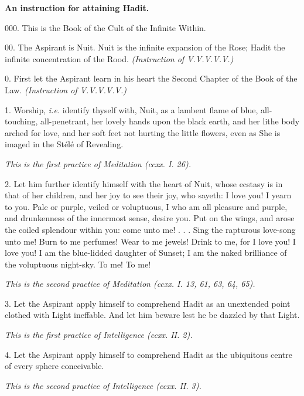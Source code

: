 

\textbf{An instruction for attaining Hadit.}

000. This is the Book of the Cult of the Infinite Within.

00. The Aspirant is Nuit. Nuit is the infinite expansion of the Rose; Hadit the infinite concentration of the Rood. \textit{(Instruction of V.V.V.V.V.)}

0. First let the Aspirant learn in his heart the Second Chapter of the Book of the Law. \textit{(Instruction of V.V.V.V.V.)}

1. Worship, \textit{i.e.} identify thyself with, Nuit, as a lambent flame of blue, all-touching, all-penetrant, her lovely hands upon the black earth, and her lithe body arched for love, and her soft feet not hurting the little flowers, even as She is imaged in the St\'{e}l\'{e} of Revealing.

\textit{This is the first practice of Meditation (ccxx. I. 26).}

2. Let him further identify himself with the heart of Nuit, whose ecstasy is in that of her children, and her joy to see their joy, who sayeth: I love you! I yearn to you. Pale or purple, veiled or voluptuous, I who am all pleasure and purple, and drunkenness of the innermost sense, desire you. Put on the wings, and arose the coiled splendour within you: come unto me! . . . Sing the rapturous love-song unto me! Burn to me perfumes! Wear to me jewels! Drink to me, for I love you! I love you! I am the blue-lidded daughter of Sunset; I am the naked brilliance of the voluptuous night-sky. To me! To me!

\textit{This is the second practice of Meditation (ccxx. I. 13, 61, 63, 64, 65).}

3. Let the Aspirant apply himself to comprehend Hadit as an unextended point clothed with Light ineffable. And let him beware lest he be dazzled by that Light.

\textit{This is the first practice of Intelligence (ccxx. II. 2).}

4. Let the Aspirant apply himself to comprehend Hadit as the ubiquitous centre of every sphere conceivable.

\textit{This is the second practice of Intelligence (ccxx. II. 3).}

